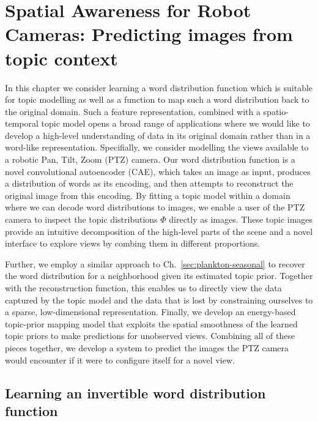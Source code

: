 
\chapter{Spatial Awareness for Robot Cameras: Predicting images from topic context} \label{ch:spatial-prediction}

In this chapter we consider learning a word distribution function which is suitable for topic modelling as well as a function to map such a word distribution back to the original domain. Such a feature representation, combined with a spatio-temporal topic model opens a broad range of applications where we would like to develop a high-level understanding of data in its original domain rather than in a word-like representation. Specifially, we consider modelling the views available to a robotic Pan, Tilt, Zoom (PTZ) camera. Our word distribution function is a novel convolutional autoencoder (CAE), which takes an image as input, produces a distribution of words as its encoding, and then attempts to reconstruct the original image from this encoding. By fitting a topic model within a domain where we can decode word distributions to images, we enable a user of the PTZ camera to inspect the topic distributions $\Phi$ directly as images. These topic images provide an intuitive decomposition of the high-level parts of the scene and a novel interface to explore views by combing them in different proportions.


Further, we employ a similar approach to Ch.~\ref{sec:plankton-seasonal} to recover the word distribution for a neighborhood given its estimated topic prior. Together with the reconstruction function, this enables us to directly view the data captured by the topic model and the data that is lost by constraining ourselves to a sparse, low-dimensional representation. Finally, we develop an energy-based topic-prior mapping model that exploits the spatial smoothness of the learned topic priors to make predictions for unobserved views. Combining all of these pieces together, we develop a system to predict the images the PTZ camera would encounter if it were to configure itself for a novel view.

\section{Learning an invertible word distribution function} \label{sec:learning-features}

